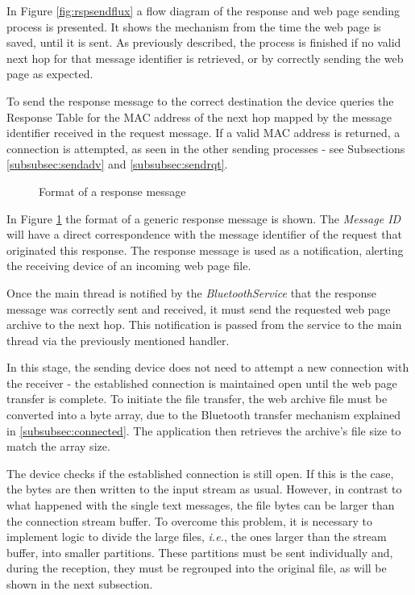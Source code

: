 In Figure \ref{fig:rspsendflux} a flow diagram of the response and web page sending process is presented. It shows the mechanism from the time the web page is saved, until it is sent. As previously described, the process is finished if no valid next hop for that message identifier is retrieved, or by correctly sending the web page as expected.

To send the response message to the correct destination the device queries the Response Table for the \gls{MAC} address of the next hop mapped by the message identifier received in the request message. If a valid \gls{MAC} address is returned, a connection is attempted, as seen in the other sending processes - see Subsections \ref{subsubsec:sendadv} and \ref{subsubsec:sendrqt}.

\begin{figure}[ht]
   \noindent{}
	\caption{\label{fig:rspmsg} Format of a response message}
\end{figure}

In Figure \ref{fig:rspmsg} the format of a generic response message is shown. The \textit{Message ID} will have a direct correspondence with the message identifier of the request that originated this response. The response message is used as a notification, alerting the receiving device of an incoming web page file.

Once the main thread is notified by the \textit{BluetoothService} that the response message was correctly sent and received, it must send the requested web page archive to the next hop. This notification is passed from the service to the main thread via the previously mentioned handler.

In this stage, the sending device does not need to attempt a new connection with the receiver - the established connection is maintained open until the web page transfer is complete. To initiate the file transfer, the web archive file must be converted into a byte array, due to the Bluetooth transfer mechanism explained in \ref{subsubsec:connected}. The application then retrieves the archive's file size to match the array size.

The device checks if the established connection is still open. If this is the case, the bytes are then written to the input stream as usual. However, in contrast to what happened with the single text messages, the file bytes can be larger than the connection stream buffer. To overcome this problem, it is necessary to implement logic to divide the large files, \textit{i.e.}, the ones larger than the stream buffer, into smaller partitions. These partitions must be sent individually and, during the reception, they must be regrouped into the original file, as will be shown in the next subsection.

